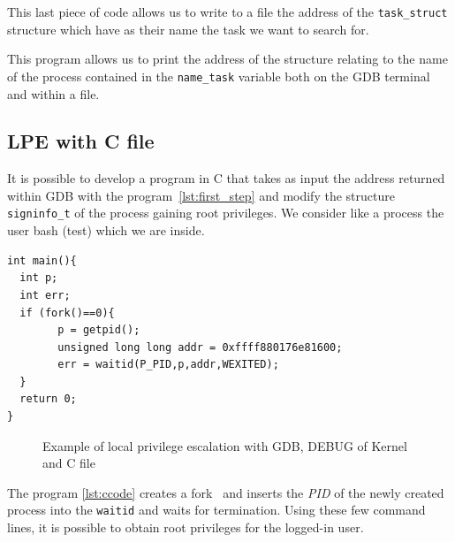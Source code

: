 \documentclass{masterthesis}
\begin{document}
This last piece of code allows us to write to a file the address of the \texttt{task\_struct} structure which have as their name the task we want to search for.

This program allows us to print the address of the structure relating to the name of the process contained in the \texttt{name\_task} variable both on the GDB terminal and within a file.

\subsection{LPE with C file}
\label{subsect:lpe_c}

It is possible to develop a program in C that takes as input the address returned within GDB with the program~\ref{lst:first_step} and modify the structure \texttt{signinfo\_t} of the process gaining root privileges.
We consider like a process the user bash (test) which we are inside.

\begin{lstlisting}[caption={C code for exploit},label={lst:ccode}]
int main(){
  int p;
  int err;
  if (fork()==0){
        p = getpid();
        unsigned long long addr = 0xffff880176e81600;
        err = waitid(P_PID,p,addr,WEXITED);
  }
  return 0;
}
\end{lstlisting}
\begin{figure}[h!]
  \caption{Example of local privilege escalation with GDB, DEBUG of Kernel and C file}\label{figure:lpe_c}
\end{figure}
The program \ref{lst:ccode} creates a fork~\cite{fork} and inserts the \emph{PID} of the newly created process into the \texttt{waitid} and waits for termination.
Using these few command lines, it is possible to obtain root privileges for the logged-in user.
 
\end{document}
